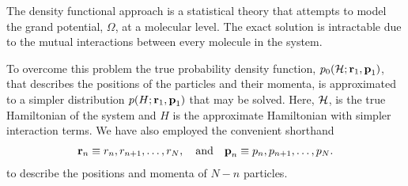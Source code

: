 The density functional approach is a statistical theory 
that attempts to model the grand potential, $\Omega$,
at a molecular level.
%
%
The exact solution is intractable due to the mutual interactions between every molecule in the system.

To overcome this problem 
the true probability density function, $p_0({\cal H}; {\mathbf{\textbf{r}}}_1,{\mathbf{\textbf{p}}}_1)$, that describes 
the positions of the particles and their momenta,
is approximated to a simpler distribution $p(H; {\mathbf{\textbf{r}}}_1, {\mathbf{\textbf{p}}}_1)$ that may be solved.
Here, ${\cal H}$, is the true Hamiltonian of the system 
and $H$ is the approximate Hamiltonian with simpler interaction terms.
We have also employed the  convenient shorthand
\begin{align}
{\mathbf{\textbf{r}}}_n \equiv r_n,r_{n+1},\ldots,r_N,  \quad\text{and}\quad
{\mathbf{\textbf{p}}}_n \equiv  p_n,p_{n+1},\ldots, p_N.
    \label{eqn:shorthand}
\end{align}
to describe the positions and momenta of  $N-n$ particles.

